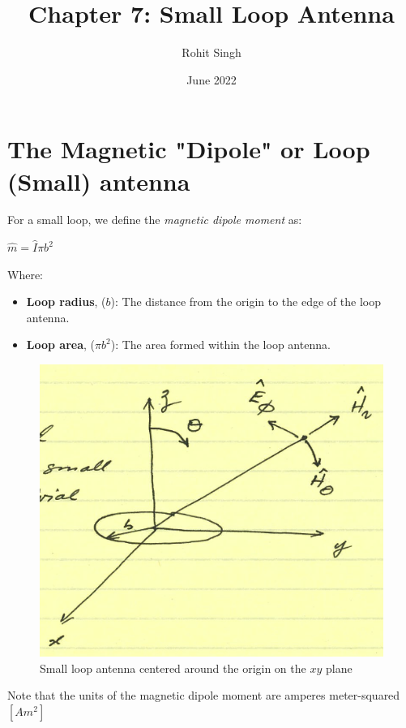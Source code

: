 \documentclass{article}
\title{Chapter 7: Small Loop Antenna}
\author{Rohit Singh}
\date{June 2022}
\begin{document}
\maketitle

\section{The Magnetic "Dipole" or Loop (Small) antenna}

For a small loop, we define the \textit{magnetic dipole moment} as:

\begin{center}
    $\hat{m} = \hat{I} \pi b^2$
\end{center}

Where:

\begin{itemize}
    \item \textbf{Loop radius}, ($b$): The distance from the origin to the edge of the loop antenna.
    \item \textbf{Loop area}, ($\pi b^2$): The area formed within the loop antenna.
\end{itemize}

\begin{figure}[H]
  \centering
     \includegraphics[scale=0.8]{Course Notes/images/7.1.png}
  \caption{Small loop antenna centered around the origin on the $xy$ plane}
\end{figure}

Note that the units of the magnetic dipole moment are amperes meter-squared $[A m^2]$ 
\end{document}
